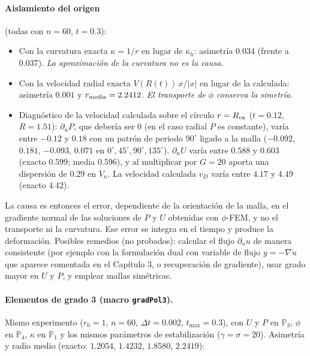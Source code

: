 \paragraph{Aislamiento del origen} (todas con $n=60$, $t=0.3$):
\begin{itemize}
	\item Con la curvatura exacta $\kappa=1/r$ en lugar de $\kappa_h$: asimetría $0.034$ (frente a $0.037$). \emph{La aproximación de la curvatura no es la causa.}
	\item Con la velocidad radial exacta $V(R(t))\,x/|x|$ en lugar de la calculada: asimetría $0.001$ y $r_{\rm media}=2.2412$. \emph{El transporte de $\phi$ conserva la simetría.}
	\item Diagnóstico de la velocidad calculada sobre el círculo $r=R_{\rm ex}$ ($t=0.12$, $R=1.51$): $\partial_nP$, que debería ser $0$ (en el caso radial $P$ es constante), varía entre $-0.12$ y $0.18$ con un patrón de periodo $90^\circ$ ligado a la malla ($-0.092$, $0.181$, $-0.093$, $0.071$ en $0^\circ,45^\circ,90^\circ,135^\circ$). $\partial_nU$ varía entre $0.588$ y $0.603$ (exacto $0.599$; media $0.596$), y al multiplicar por $G=20$ aporta una dispersión de $0.29$ en $V_n$. La velocidad calculada $v_D$ varía entre $4.17$ y $4.49$ (exacto $4.42$).
\end{itemize}
La causa es entonces el error, dependiente de la orientación de la malla, en el gradiente normal de las soluciones de $P$ y $U$ obtenidas con $\phi$-FEM, y no el transporte ni la curvatura. Ese error se integra en el tiempo y produce la deformación. Posibles remedios (no probados): calcular el flujo $\partial_n u$ de manera consistente (por ejemplo con la formulación dual con variable de flujo $y=-\nabla u$ que aparece comentada en el Capítulo 3, o recuperación de gradiente), usar grado mayor en $U$ y $P$, y emplear mallas simétricas.

\paragraph{Elementos de grado 3 (macro \texttt{gradPol3}).} Mismo experimento ($r_0=1$, $n=60$, $\Delta t=0.002$, $t_{\max}=0.3$), con $U$ y $P$ en $\mathbb{P}_3$, $\phi$ en $\mathbb{P}_4$, $\kappa$ en $\mathbb{P}_1$ y los mismos parámetros de estabilización ($\gamma=\sigma=20$). Asimetría y radio medio (exacto: $1.2054$, $1.4232$, $1.8580$, $2.2419$):

